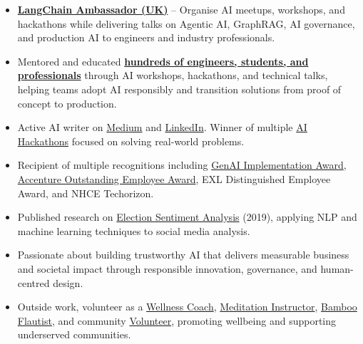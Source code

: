\begin{itemize}

\item \href{https://www.langchain.com/community}{\textbf{LangChain Ambassador (UK)}} – Organise AI meetups, workshops, and hackathons while delivering talks on Agentic AI, GraphRAG, AI governance, and production AI to engineers and industry professionals.


\item Mentored and educated \href{https://www.youtube.com/watch?v=4p6AbIEDKlo}{\textbf{hundreds of engineers, students, and professionals}} through AI workshops, hackathons, and technical talks, helping teams adopt AI responsibly and transition solutions from proof of concept to production.

\item Active AI writer on \href{https://medium.com/@sudipkandel123}{Medium} and \href{https://www.linkedin.com/in/sudipkandel123/recent-activity/all/}{LinkedIn}. Winner of multiple \href{https://www.linkedin.com/posts/sudipkandel123_climatetech-hackathon-climateimpact-activity-7332676377139220480-ME62?utm_source=social_share_send&utm_medium=member_desktop_web&rcm=ACoAACNaIOIByDVJQwNDzB2vojgBsEqgFxt4WaU}{AI Hackathons} focused on solving real-world problems.

\item Recipient of multiple recognitions including \href{https://www.linkedin.com/in/sudipkandel123/overlay/1720113251858/single-media-viewer/?profileId=ACoAACNaIOIByDVJQwNDzB2vojgBsEqgFxt4WaU}{GenAI Implementation Award}, \href{https://www.linkedin.com/in/sudipkandel123/overlay/1720113335982/single-media-viewer/?profileId=ACoAACNaIOIByDVJQwNDzB2vojgBsEqgFxt4WaU}{Accenture Outstanding Employee Award}, EXL Distinguished Employee Award, and NHCE Techorizon.

\item Published research on \href{https://www.researchgate.net/publication/335815184_Election_Sentimental_Analysis_using_Swift}{Election Sentiment Analysis} (2019), applying NLP and machine learning techniques to social media analysis.

\item Passionate about building trustworthy AI that delivers measurable business and societal impact through responsible innovation, governance, and human-centred design.

\item Outside work, volunteer as a \href{https://kashishyoga.com/}{Wellness Coach}, \href{https://www.youtube.com/watch?v=mO6ZT-hMvPI&t=4s}{Meditation Instructor}, \href{https://www.facebook.com/share/r/199Tosq9tb/}{Bamboo Flautist}, and community \href{https://www.linkedin.com/in/sudipkandel123/overlay/1744116095553/single-media-viewer/?profileId=ACoAACNaIOIByDVJQwNDzB2vojgBsEqgFxt4WaU}{Volunteer}, promoting wellbeing and supporting underserved communities.

\end{itemize}
